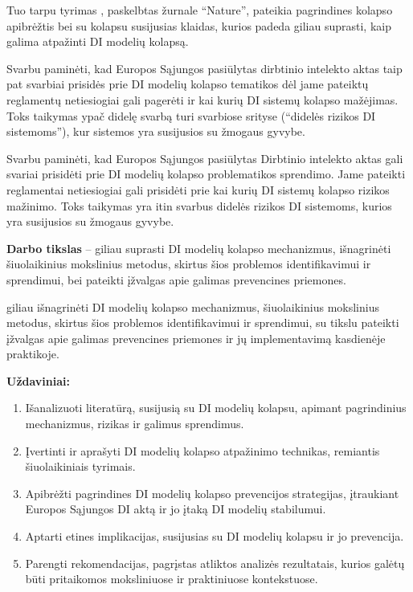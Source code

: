 \documentclass{VUMIFInfKursinis}
\begin{document}

Tuo tarpu tyrimas \cite{AICollapseNature}, paskelbtas žurnale \enquote{Nature}, pateikia pagrindines kolapso apibrėžtis bei su kolapsu susijusias klaidas, kurios padeda giliau suprasti, kaip galima atpažinti DI modelių kolapsą.

Svarbu paminėti, kad Europos Sąjungos pasiūlytas dirbtinio intelekto aktas \cite{AIEuropeanAct} taip pat svarbiai prisidės prie DI modelių kolapso tematikos dėl jame pateiktų reglamentų netiesiogiai gali pagerėti ir kai kurių DI sistemų kolapso mažėjimas. Toks taikymas ypač didelę svarbą turi svarbiose srityse (\enquote{didelės rizikos DI sistemoms}), kur sistemos yra susijusios su žmogaus gyvybe.

Svarbu paminėti, kad Europos Sąjungos pasiūlytas Dirbtinio intelekto aktas \cite{AIEuropeanAct} gali svariai prisidėti prie DI modelių kolapso problematikos sprendimo. Jame pateikti reglamentai netiesiogiai gali prisidėti prie kai kurių DI sistemų kolapso rizikos mažinimo. Toks taikymas yra itin svarbus didelės rizikos DI sistemoms, kurios yra susijusios su žmogaus gyvybe.




\textbf{Darbo tikslas} – giliau suprasti DI modelių kolapso mechanizmus, išnagrinėti šiuolaikinius mokslinius metodus, skirtus šios problemos identifikavimui ir sprendimui, bei pateikti įžvalgas apie galimas prevencines priemones.

giliau išnagrinėti DI modelių kolapso mechanizmus,  šiuolaikinius mokslinius metodus, skirtus šios problemos identifikavimui ir sprendimui, su tikslu pateikti įžvalgas apie galimas prevencines priemones ir jų implementavimą kasdienėje praktikoje.

\textbf{Uždaviniai:}
\begin{enumerate}
    \item Išanalizuoti literatūrą, susijusią su DI modelių kolapsu, apimant pagrindinius mechanizmus, rizikas ir galimus sprendimus.
    \item Įvertinti ir aprašyti DI modelių kolapso atpažinimo technikas, remiantis šiuolaikiniais tyrimais.
    \item Apibrėžti pagrindines DI modelių kolapso prevencijos strategijas, įtraukiant Europos Sąjungos DI aktą ir jo įtaką DI modelių stabilumui.
    \item Aptarti etines implikacijas, susijusias su DI modelių kolapsu ir jo prevencija.
    \item Parengti rekomendacijas, pagrįstas atliktos analizės rezultatais, kurios galėtų būti pritaikomos moksliniuose ir praktiniuose kontekstuose.
\end{enumerate}
\end{document}
